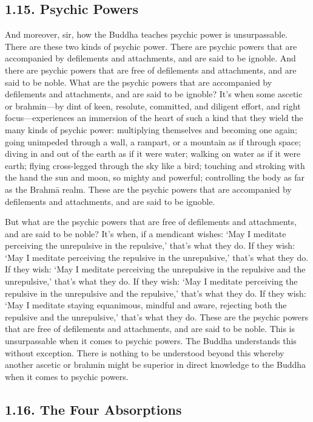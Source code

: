 \documentclass[12pt,openany]{book}%
\begin{document}
\subsection*{1.15. Psychic Powers }

And moreover, sir, how the Buddha teaches psychic power is unsurpassable. There are these two kinds of psychic power. There are psychic powers that are accompanied by defilements and attachments, and are said to be ignoble. And there are psychic powers that are free of defilements and attachments, and are said to be noble. What are the psychic powers that are accompanied by defilements and attachments, and are said to be ignoble? It’s when some ascetic or brahmin—by dint of keen, resolute, committed, and diligent effort, and right focus—experiences an immersion of the heart of such a kind that they wield the many kinds of psychic power: multiplying themselves and becoming one again; going unimpeded through a wall, a rampart, or a mountain as if through space; diving in and out of the earth as if it were water; walking on water as if it were earth; flying cross-legged through the sky like a bird; touching and stroking with the hand the sun and moon, so mighty and powerful; controlling the body as far as the \textsanskrit{Brahmā} realm. These are the psychic powers that are accompanied by defilements and attachments, and are said to be ignoble. 

But what are the psychic powers that are free of defilements and attachments, and are said to be noble? It’s when, if a mendicant wishes: ‘May I meditate perceiving the unrepulsive in the repulsive,’ that’s what they do. If they wish: ‘May I meditate perceiving the repulsive in the unrepulsive,’ that’s what they do. If they wish: ‘May I meditate perceiving the unrepulsive in the repulsive and the unrepulsive,’ that’s what they do. If they wish: ‘May I meditate perceiving the repulsive in the unrepulsive and the repulsive,’ that’s what they do. If they wish: ‘May I meditate staying equanimous, mindful and aware, rejecting both the repulsive and the unrepulsive,’ that’s what they do. These are the psychic powers that are free of defilements and attachments, and are said to be noble. This is unsurpassable when it comes to psychic powers. The Buddha understands this without exception. There is nothing to be understood beyond this whereby another ascetic or brahmin might be superior in direct knowledge to the Buddha when it comes to psychic powers. 

\subsection*{1.16. The Four Absorptions }
\end{document}
